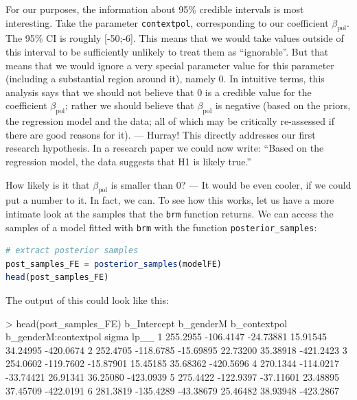 \documentclass[nobib]{tufte-handout}
\begin{document}
For our purposes, the information about 95\% credible intervals is most interesting. Take the parameter \texttt{contextpol}, corresponding to our coefficient $\beta_{\text{pol}}$. The 95\% CI is roughly [-50;-6]. This means that we would take values outside of this interval to be sufficiently unlikely to treat them as ``ignorable''. But that means that we would ignore a very special parameter value for this parameter (including a substantial region around it), namely 0. In intuitive terms, this analysis says that we should not believe that 0 is a credible value for the coefficient $\beta_{\text{pol}}$; rather we should believe that $\beta_{\text{pol}}$ is negative (based on the priors, the regression model and the data; all of which may be critically re-assessed if there are good reasons for it). --- Hurray! This directly addresses our first research hypothesis. In a research paper we could now write: ``Based on the regression model, the data suggests that H1 is likely true.''

How likely is it that $\beta_{\text{pol}}$ is smaller than 0? --- It would be even cooler, if we could put a number to it. In fact, we can. To see how this works, let us have a more intimate look at the samples that the \texttt{brm} function returns. We can access the samples of a model fitted with \texttt{brm} with the function \texttt{posterior\_samples}:

\begin{minipage}[]{\textwidth}
\begin{lstlisting}[language=R]
# extract posterior samples 
post_samples_FE = posterior_samples(modelFE)
head(post_samples_FE)
\end{lstlisting}
\end{minipage}

The output of this could look like this:

\medskip

\begin{minipage}[]{1.2\textwidth}
\begin{rc}
> head(post_samples_FE)
  b_Intercept b_genderM b_contextpol b_genderM:contextpol    sigma      lp__
1    255.2955 -106.4147    -24.73881             15.91545 34.24995 -420.0674
2    252.4705 -118.6785    -15.69895             22.73200 35.38918 -421.2423
3    254.0602 -119.7602    -15.87901             15.45185 35.68362 -420.5696
4    270.1344 -114.0217    -33.74421             26.91341 36.25080 -423.0939
5    275.4422 -122.9397    -37.11601             23.48895 37.45709 -422.0191
6    281.3819 -135.4289    -43.38679             25.46482 38.93948 -423.2867
\end{rc}
\end{minipage}
\end{document}
